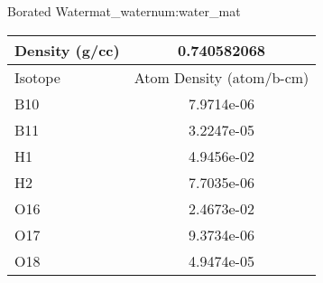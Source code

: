 \begin{matitem}{Borated Water}{mat_water}{num:water_mat}
  \centering
  \begin{tabular}{l c}
    \toprule
    Density (g/cc) & 0.740582068 \\
    \midrule
    Isotope & Atom Density (atom/b-cm) \\
    \midrule
    \midrule
B10 & 7.9714e-06 \\
B11 & 3.2247e-05 \\
H1 & 4.9456e-02 \\
H2 & 7.7035e-06 \\
O16 & 2.4673e-02 \\
O17 & 9.3734e-06 \\
O18 & 4.9474e-05 \\

    \bottomrule
  \end{tabular}
\end{matitem}
